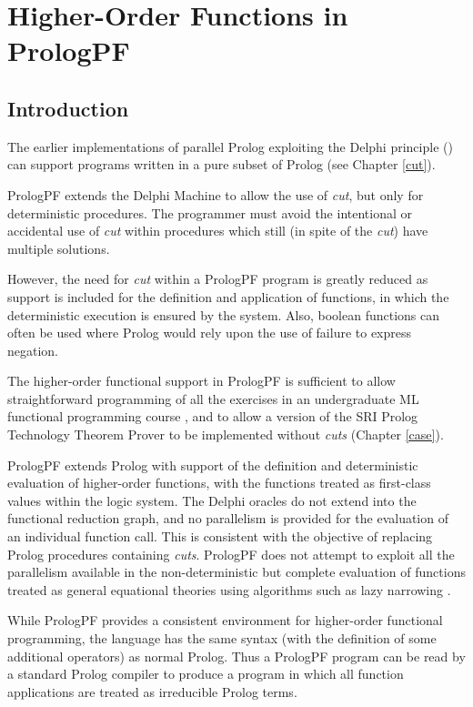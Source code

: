 \chapter{Higher-Order Functions in PrologPF}
\label{functions}

\section{Introduction}

The earlier implementations of parallel Prolog exploiting the Delphi
principle (\cite{CA87,Clo87,Wre90,Kle91,Sar95})
can support programs written in a pure subset of Prolog (see Chapter
\ref{cut}).

PrologPF extends the Delphi Machine to allow the use of \textit{cut},
but only for
deterministic procedures.  The programmer must avoid the
intentional or accidental use of \textit{cut} within
procedures which still (in spite of the \textit{cut}) have
multiple solutions.  

However, the need for \textit{cut} within a
PrologPF program is greatly reduced as
support is included for the definition and application
of functions, in which the deterministic
execution is ensured by the system.  Also, boolean functions can often
be used where Prolog would rely upon the use of failure to express negation.

The higher-order functional support in PrologPF is sufficient to allow
straightforward programming of all the exercises in an undergraduate ML
functional programming course \cite{Pau88}, and to allow a version of the SRI Prolog 
Technology Theorem Prover \cite{Sti88} to be implemented without \textit{cuts}
(Chapter \ref{case}).

PrologPF extends Prolog with support of the definition and deterministic
evaluation of higher-order functions, with the functions treated as
first-class values within the logic system.  The Delphi oracles do not
extend into the functional reduction graph, and no parallelism is provided for
the evaluation of an individual function call.  This is consistent with the
objective of replacing Prolog procedures containing \textit{cuts}.  
PrologPF does not
attempt to exploit all the parallelism available in the non-deterministic but
complete evaluation of functions treated as general equational theories using
algorithms such as lazy narrowing \cite{CL91}.

While PrologPF provides a consistent environment for
higher-order functional
programming, the language has the same syntax (with the definition of some
additional operators) as normal Prolog.  Thus a PrologPF program can be
read by a standard Prolog compiler to produce a program in which all
function applications are treated as irreducible Prolog terms.

